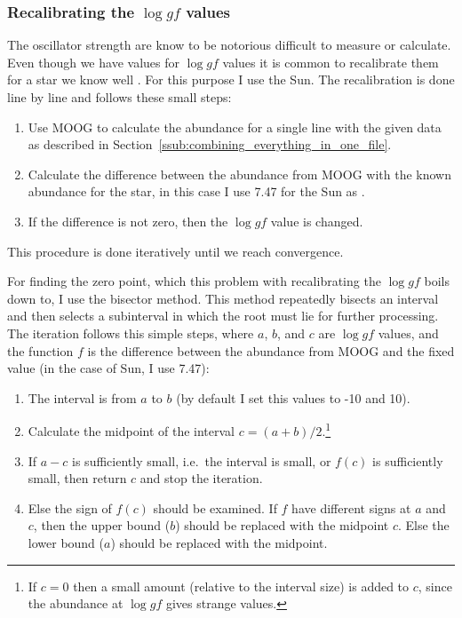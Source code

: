 \documentclass{aa}
\begin{document}
\subsubsection{Recalibrating the $\log gf$ values}
\label{ssub:recalibrating_the_log_gf_values}
The oscillator strength are know to be notorious difficult to measure or
calculate. Even though we have values for $\log gf$ values it is common to
recalibrate them for a star we know well \citep{2012Onehag}. For this purpose I
use the Sun. The recalibration is done line by line and follows these small
steps:
\begin{enumerate}
    \item Use MOOG to calculate the abundance for a single line with the given
        data as described in
        Section~\ref{ssub:combining_everything_in_one_file}.
    \item Calculate the difference between the abundance from MOOG with the
        known abundance for the star, in this case I use 7.47 for the Sun as
        \citet{Gonzales2000}.
    \item If the difference is not zero, then the $\log gf$ value is changed.
\end{enumerate}
This procedure is done iteratively until we reach convergence.

For finding the zero point, which this problem with recalibrating the $\log gf$
boils down to, I use the bisector method. This method repeatedly bisects an
interval and then selects a subinterval in which the root must lie for further
processing. The iteration follows this simple steps, where $a$, $b$, and $c$
are $\log gf$ values, and the function $f$ is the difference between the
abundance from MOOG and the fixed value (in the case of Sun, I use 7.47):
\begin{enumerate}
    \item The interval is from $a$ to $b$ (by default I set this values to -10
        and 10).
    \item Calculate the midpoint of the interval $c=(a+b)/2$.\footnote{If $c=0$
            then a small amount (relative to the interval size) is added to
            $c$, since the abundance at $\log gf$ gives strange values.}
    \item If $a-c$ is sufficiently small, i.e.\ the interval is small, or $f(c)$
        is sufficiently small, then return $c$ and stop the iteration.
    \item Else the sign of $f(c)$ should be examined. If $f$ have different
        signs at $a$ and $c$, then the upper bound ($b$) should be replaced
        with the midpoint $c$. Else the lower bound ($a$) should be replaced
        with the midpoint.
\end{enumerate}
\end{document}
